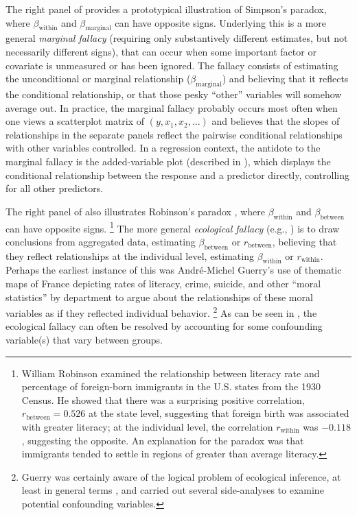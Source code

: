 The right panel of  provides a prototypical illustration of Simpson's paradox,
where $\beta_{\textrm{within}}$ and $\beta_{\textrm{marginal}}$ can have opposite signs. Underlying this is a
more general \emph{marginal fallacy} (requiring only substantively different estimates, but not necessarily
different signs),
that can occur when some important factor or covariate is unmeasured
or has been ignored. The fallacy consists of estimating the unconditional or marginal
relationship ($\beta_{\textrm{marginal}}$) and believing that it reflects the conditional relationship, or that
those pesky ``other'' variables will somehow average out. In practice, the marginal fallacy probably occurs most
often when one views a scatterplot matrix of $(y, x_1, x_2, \dots)$ and believes that the slopes of
relationships in the separate panels reflect the pairwise conditional relationships with other variables
controlled. In a regression context, the antidote to the marginal fallacy is the added-variable
plot (described in ),
which displays the conditional relationship between the response and a predictor directly, controlling for all other predictors.

The right panel of  also illustrates Robinson's paradox \citep{Robinson:1950},
where $\beta_{\textrm{within}}$ and $\beta_{\textrm{between}}$ can have opposite signs.%
\footnote{
William Robinson \citeyearpar{Robinson:1950} examined the relationship between literacy rate and percentage
of foreign-born immigrants in the U.S. states from the 1930 Census.
He showed that there was a surprising
positive correlation, $r_{\textrm{between}}= 0.526$ at the state level,
suggesting that foreign birth was associated with greater literacy;
at the individual level, the correlation $r_{\textrm{within}}$ was $-0.118$, suggesting the opposite.
An explanation for the paradox was that immigrants tended to settle in regions of greater than
average literacy.
}
The more general \emph{ecological fallacy} (e.g., \citealp{Freedman:01})
is to draw conclusions from aggregated data, estimating
$\beta_{\textrm{between}}$ or $r_{\textrm{between}}$, believing that they reflect relationships
at the individual level, estimating $\beta_{\textrm{within}}$ or $r_{\textrm{within}}$.
Perhaps the earliest instance of this was Andr\'e-Michel Guerry's \citeyearpar{Guerry:1833} use of thematic maps of
France depicting rates of literacy, crime, suicide, and other ``moral statistics'' by department to argue
about the relationships of these moral variables as if they reflected individual behavior.%
\footnote{
Guerry was certainly aware of the logical problem of ecological inference, at least in general terms
\citep{Friendly:07:guerry}, and carried out several side-analyses to examine potential confounding
variables.
}
As can be seen in , the ecological fallacy can often be resolved
by accounting for some confounding variable(s) that vary between groups.

